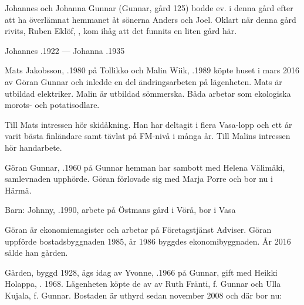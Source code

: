 %


%
Johannes och Johanna Gunnar (Gunnar, gård 125) bodde ev. i denna gård efter att ha överlämnat hemmanet åt sönerna Anders och Joel. Oklart när denna gård rivits, Ruben Eklöf, , kom ihåg att det funnits en liten gård här.

Johannes .1922  ---  Johanna .1935



%



%
Mats Jakobsson, .1980 på Tollikko och Malin Wiik, .1989 köpte huset i mars 2016 av Göran Gunnar och inledde en del ändringsarbeten på lägenheten. Mats är utbildad elektriker. Malin är utbildad sömmerska. Båda arbetar som ekologiska morots- och potatisodlare.

Till Mats intressen hör skidåkning. Han har deltagit i flera Vasa-lopp och ett år varit bästa finländare samt tävlat på FM-nivå i många år. Till Malins intressen hör handarbete.


%
Göran Gunnar, .1960 på Gunnar hemman har sambott med Helena Välimäki, samlevnaden upphörde. Göran förlovade sig med Marja Porre och bor nu i Härmä.

Barn: Johnny, .1990, arbete på Östmans gård i Vörå, bor i Vasa

Göran är ekonomiemagister och arbetar på Företagstjänst Adviser. Göran uppförde bostadsbyggnaden 1985, år 1986 byggdes ekonomibyggnaden. År 2016 sålde han gården.



%



%
Gården, byggd 1928, ägs idag av Yvonne, .1966 på Gunnar, gift med Heikki Holappa, . 1968. Lägenheten köpte de av av Ruth Fränti, f. Gunnar och Ulla Kujala, f. Gunnar. Bostaden är uthyrd sedan november 2008 och där bor nu:

